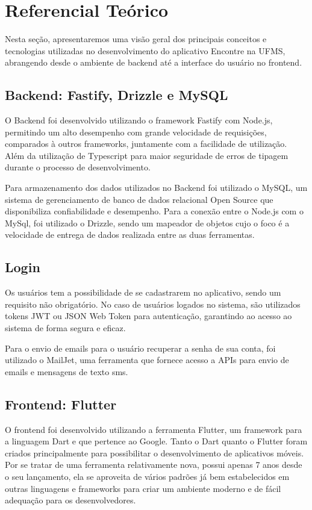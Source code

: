 \section{Referencial Teórico}

Nesta seção, apresentaremos uma visão geral dos principais conceitos e tecnologias utilizadas no desenvolvimento do aplicativo Encontre na UFMS, abrangendo desde o ambiente de backend até a interface do usuário no frontend.

\subsection{Backend: Fastify, Drizzle e MySQL}
O Backend foi desenvolvido utilizando o framework Fastify com Node.js, permitindo um alto desempenho com grande velocidade de requisições, comparados à outros frameworks, juntamente com a facilidade de utilização. Além da utilização de Typescript para maior seguridade de erros de tipagem durante o processo de desenvolvimento.

Para armazenamento dos dados utilizados no Backend foi utilizado o MySQL, um sistema de gerenciamento de banco de dados relacional Open Source que disponibiliza confiabilidade e desempenho. Para a conexão entre o Node.js com o MySql, foi utilizado o Drizzle, sendo um mapeador de objetos cujo o foco é a velocidade de entrega de dados realizada entre as duas ferramentas.

\subsection{Login}
Os usuários tem a possibilidade de se cadastrarem no aplicativo, sendo um requisito não obrigatório. No caso de usuários logados no sistema, são utilizados tokens JWT ou JSON Web Token para autenticação, garantindo ao acesso ao sistema de forma segura e eficaz.

Para o envio de emails para o usuário recuperar a senha de sua conta, foi utilizado o MailJet, uma ferramenta que fornece acesso a APIs para envio de emails e mensagens de texto sms.

\subsection{Frontend: Flutter}
O frontend foi desenvolvido utilizando a ferramenta Flutter, um framework para a linguagem Dart e que pertence ao Google. Tanto o Dart quanto o Flutter foram criados principalmente para possibilitar o desenvolvimento de aplicativos móveis. Por se tratar de uma ferramenta relativamente nova, possui apenas 7 anos desde o seu lançamento, ela se aproveita de vários padrões já bem estabelecidos em outras linguagens e frameworks para criar um ambiente moderno e de fácil adequação para os desenvolvedores.

